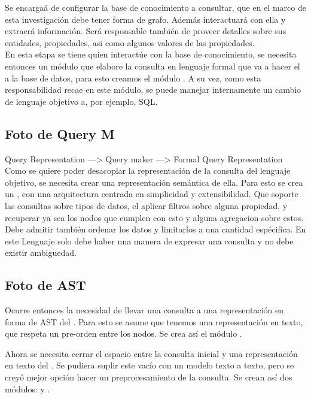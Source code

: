 Se encarga\'a de configurar la base de conocimiento a consultar, que en el marco de esta investigaci\'on debe tener forma de grafo. Adem\'as interactuar\'a con ella y extraer\'a informaci\'on. Ser\'a responsable tambi\'en de proveer detalles sobre sus entidades, propiedades, asi como algunos valores de las propiedades.\\

En esta etapa se tiene quien interact\'ue con la base de conocimiento, se necesita entonces un m\'odulo que elabore la consulta en lenguaje formal que va a hacer el  a la base de datos, para esto creamos el m\'odulo . A su vez, como esta responsabilidad recae en este m\'odulo, se puede manejar internamente un cambio de lenguaje objetivo a, por ejemplo, SQL.\\

\subsection{Foto de Query M}
Query Representation ---> Query maker ---> Formal Query Representation\\

Como se quiere poder desacoplar la representaci\'on de la consulta del lenguaje objetivo, se necesita crear una representaci\'on sem\'antica de ella. Para esto se crea un , con una arquitectura centrada en simplicidad y extensibilidad. Que soporte las consultas sobre tipos de datos, el aplicar filtros sobre alguna propiedad, y recuperar ya sea los nodos que cumplen con esto y alguna agregacion sobre estos. Debe admitir tambi\'en ordenar los datos y limitarlos a una cantidad esp\'ecifica. En este Lenguaje solo debe haber una manera de expresar una consulta y no debe existir ambiguedad.\\
\subsection{Foto de AST}




Ocurre entonces la necesidad de llevar una consulta a una representaci\'on en forma de AST del . Para esto se asume que tenemos una representaci\'on en texto, que respeta un pre-orden entre los nodos. Se crea as\'i el m\'odulo .



Ahora se necesita cerrar el espacio entre la consulta inicial y una representaci\'on en texto del . Se pudiera suplir este vac\'io con un modelo texto a texto, pero se crey\'o mejor opci\'on hacer un preprocesamiento de la consulta. Se crean as\'i dos m\'odulos:   y .\\

